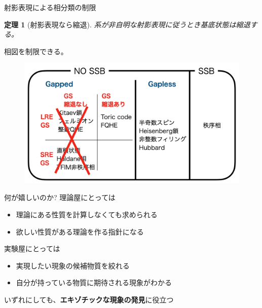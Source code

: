 \documentclass[dvipdfm]{beamer}
\newtheorem*{them}{定理}
\begin{document}



\begin{frame}{射影表現による相分類の制限}
    \begin{them}[射影表現なら縮退]
        系が非自明な射影表現に従うとき基底状態は縮退する。
    \end{them}
    相図を制限できる。
    \begin{figure}
        \centering
        \includegraphics[width=0.8\linewidth]{phaseLSM.png}
    \end{figure}
\end{frame}


\begin{frame}{何が嬉しいのか?}
    理論屋にとっては
    \begin{itemize}
        \item 理論にある性質を計算しなくても求められる
        \item 欲しい性質がある理論を作る指針になる
    \end{itemize}
    実験屋にとっては
    \begin{itemize}
        \item 実現したい現象の候補物質を絞れる
        \item 自分が持っている物質に期待される現象がわかる
    \end{itemize}
    いずれにしても、\alert{\textbf{エキゾチックな現象の発見}}に役立つ
\end{frame}
\end{document}
